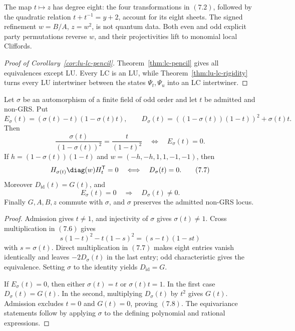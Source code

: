 The map \(t\mapsto z\) has degree eight: the four transformations in
\((7.2)\), followed by the quadratic relation
\(t+t^{-1}=y+2\), account for its eight sheets.  The signed refinement
\(w=B/A\), \(z=w^2\), is not quantum data.  Both even and odd explicit
party permutations reverse \(w\), and their projectivities lift to
monomial local Cliffords.

\begin{proof}[Proof of Corollary~\ref{cor:lu-lc-pencil}]
Theorem~\ref{thm:lc-pencil} gives all equivalences except LU.  Every LC is
an LU, while Theorem~\ref{thm:lu-lc-rigidity} turns every LU intertwiner
between the states \(\Psi_t,\Psi_u\) into an LC intertwiner.
\end{proof}

\begin{proposition}
\label{prop:frobenius-sector-divisors}
Let \(\sigma\) be an automorphism of a finite field of odd order and let
\(t\) be admitted and non-GRS.  Put
\[
 E_\sigma(t)=(\sigma(t)-t)(1-\sigma(t)t),\qquad
 D_\sigma(t)=((1-\sigma(t))(1-t))^2+\sigma(t)t.
\]
Then
\[
 \frac{\sigma(t)}{(1-\sigma(t))^2}
   =\frac{t}{(1-t)^2}
 \quad\Longleftrightarrow\quad E_\sigma(t)=0.            \tag{7.6}
\]
If \(h=(1-\sigma(t))(1-t)\) and
\(w=(-h,-h,1,1,-1,-1)\), then
\[
 H_{\sigma(t)}\diag(w)H_t^{\mathsf T}=0
 \quad\Longleftrightarrow\quad D_\sigma(t)=0.            \tag{7.7}
\]
Moreover \(D_{\mathrm{id}}(t)=G(t)\), and
\[
 E_\sigma(t)=0\quad\Longrightarrow\quad D_\sigma(t)\ne0.
                                                               \tag{7.8}
\]
Finally \(G,A,B,z\) commute with \(\sigma\), and \(\sigma\) preserves the
admitted non-GRS locus.
\end{proposition}

\begin{proof}
Admission gives \(t\ne1\), and injectivity of \(\sigma\) gives
\(\sigma(t)\ne1\).  Cross multiplication in \((7.6)\) gives
\[
 s(1-t)^2-t(1-s)^2=(s-t)(1-st)
\]
with \(s=\sigma(t)\).  Direct multiplication in \((7.7)\) makes eight
entries vanish identically and leaves \(-2D_\sigma(t)\) in the last
entry; odd characteristic gives the equivalence.  Setting \(\sigma\) to
the identity yields \(D_{\mathrm{id}}=G\).

If \(E_\sigma(t)=0\), then either \(\sigma(t)=t\) or
\(\sigma(t)t=1\).  In the first case \(D_\sigma(t)=G(t)\).  In the
second, multiplying \(D_\sigma(t)\) by \(t^2\) gives \(G(t)\).
Admission excludes \(t=0\) and \(G(t)=0\), proving \((7.8)\).
The equivariance statements follow by applying \(\sigma\) to the
defining polynomial and rational expressions.
\end{proof}


